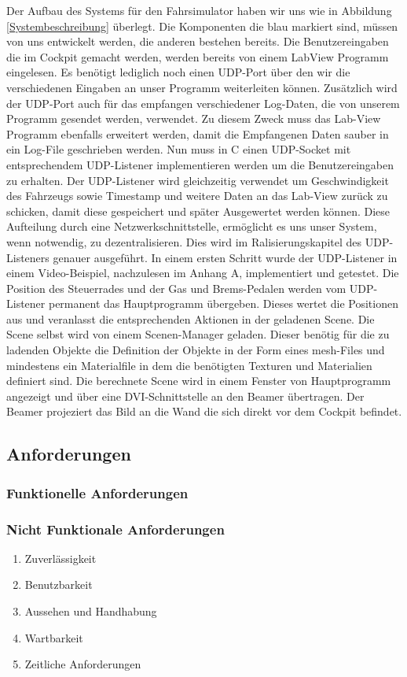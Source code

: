 Der Aufbau des Systems für den Fahrsimulator haben wir uns wie in Abbildung \ref{Systembeschreibung} überlegt. Die Komponenten die blau markiert sind, müssen von uns entwickelt werden, die anderen bestehen bereits. 
Die Benutzereingaben die im Cockpit gemacht werden, werden bereits von einem LabView Programm eingelesen. Es benötigt lediglich noch einen UDP-Port über den wir die verschiedenen Eingaben an unser Programm weiterleiten können. Zusätzlich wird der UDP-Port auch für das empfangen verschiedener Log-Daten, die von unserem Programm gesendet werden, verwendet. Zu diesem Zweck muss das Lab-View Programm ebenfalls erweitert werden, damit die Empfangenen Daten sauber in ein Log-File geschrieben werden. 
Nun muss in C einen UDP-Socket mit entsprechendem UDP-Listener implementieren werden um die Benutzereingaben zu erhalten. Der UDP-Listener wird gleichzeitig verwendet um Geschwindigkeit des Fahrzeugs sowie Timestamp und weitere Daten an das Lab-View zurück zu schicken, damit diese gespeichert und später Ausgewertet werden können. Diese Aufteilung durch eine Netzwerkschnittstelle, ermöglicht es uns unser System, wenn notwendig, zu dezentralisieren. Dies wird im Ralisierungskapitel des UDP-Listeners genauer ausgeführt. In einem ersten Schritt wurde der UDP-Listener in einem Video-Beispiel, nachzulesen im Anhang A, implementiert und getestet. 
Die Position des Steuerrades und der Gas und Brems-Pedalen werden vom UDP-Listener permanent das Hauptprogramm übergeben. Dieses wertet die Positionen aus und veranlasst die entsprechenden Aktionen in der geladenen Scene. 
Die Scene selbst wird von einem Scenen-Manager geladen. Dieser benötig für die zu ladenden Objekte die Definition der Objekte in der Form eines mesh-Files und mindestens ein Materialfile in dem die benötigten Texturen und Materialien definiert sind. Die berechnete Scene wird in einem Fenster von Hauptprogramm angezeigt und über eine DVI-Schnittstelle an den Beamer übertragen. Der Beamer projeziert das Bild an die Wand die sich direkt vor dem Cockpit befindet. 

\subsection{Anforderungen}
\subsubsection{Funktionelle Anforderungen}

\subsubsection {Nicht Funktionale Anforderungen}
\renewcommand{\labelenumi}{\alph{enumi})}
\begin{enumerate}
\item Zuverlässigkeit
\item Benutzbarkeit
\item Aussehen und Handhabung
\item Wartbarkeit
\item Zeitliche Anforderungen
\end{enumerate}
